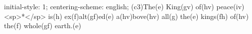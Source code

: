 initial-style: 1;
centering-scheme: english;
(c3)The(e) King(gv) of(hv) peace(iv) <sp>*</sp> is(h) ex(f)alt(gf)ed(e) a(hv)bove(hv) all(g) the(e) kings(fh) of(hv) the(f) whole(gf) earth.(e)
